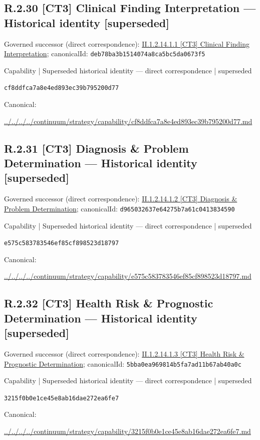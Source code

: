 \documentclass[10pt,a4paper]{article}
\begin{document}
\subsection*{R.2.30 [CT3] Clinical Finding Interpretation — Historical identity [superseded]}
Governed successor (direct correspondence): \hyperref[element-deb78ba3b1514074a8ca5bc5da0673f5]{II.1.2.14.1.1 [CT3] Clinical Finding Interpretation}; canonicalId: \texttt{deb78ba3b1514074a8ca5bc5da0673f5}\par
\label{element-cf8ddfca7a8e4ed893ec39b795200d77}
{\small Capability | Superseded historical identity — direct correspondence | superseded}\par
\texttt{cf8ddfca7a8e4ed893ec39b795200d77}\par
Canonical: \par
{\footnotesize\url{../../../../continuum/strategy/capability/cf8ddfca7a8e4ed893ec39b795200d77.md}}\par
\subsection*{R.2.31 [CT3] Diagnosis \& Problem Determination — Historical identity [superseded]}
Governed successor (direct correspondence): \hyperref[element-d965032637e64275b7a61c0413834590]{II.1.2.14.1.2 [CT3] Diagnosis \& Problem Determination}; canonicalId: \texttt{d965032637e64275b7a61c0413834590}\par
\label{element-e575c583783546ef85cf898523d18797}
{\small Capability | Superseded historical identity — direct correspondence | superseded}\par
\texttt{e575c583783546ef85cf898523d18797}\par
Canonical: \par
{\footnotesize\url{../../../../continuum/strategy/capability/e575c583783546ef85cf898523d18797.md}}\par
\subsection*{R.2.32 [CT3] Health Risk \& Prognostic Determination — Historical identity [superseded]}
Governed successor (direct correspondence): \hyperref[element-5bba0ea969814b5fa7ad11b67ab40a0c]{II.1.2.14.1.3 [CT3] Health Risk \& Prognostic Determination}; canonicalId: \texttt{5bba0ea969814b5fa7ad11b67ab40a0c}\par
\label{element-3215f0b0e1ce45e8ab16dae272ea6fe7}
{\small Capability | Superseded historical identity — direct correspondence | superseded}\par
\texttt{3215f0b0e1ce45e8ab16dae272ea6fe7}\par
Canonical: \par
{\footnotesize\url{../../../../continuum/strategy/capability/3215f0b0e1ce45e8ab16dae272ea6fe7.md}}\par
\end{document}
